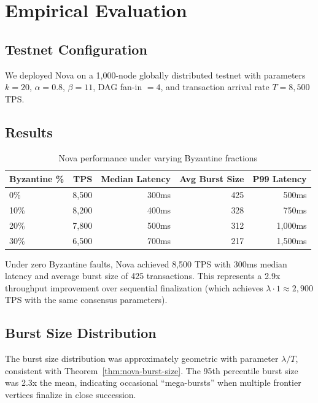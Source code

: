 \section{Empirical Evaluation}

\label{sec:nova-evaluation}

\subsection{Testnet Configuration}

We deployed Nova on a 1,000-node globally distributed testnet with parameters
$k = 20$, $\alpha = 0.8$, $\beta = 11$, DAG fan-in $= 4$, and transaction arrival
rate $T = 8{,}500$ TPS.

\subsection{Results}

\begin{table}[h]
\centering
\begin{tabular}{@{}lrrrr@{}}
\toprule
\textbf{Byzantine \%} & \textbf{TPS} & \textbf{Median Latency} & \textbf{Avg Burst Size} & \textbf{P99 Latency} \\
\midrule
0\% & 8,500 & 300ms & 425 & 500ms \\
10\% & 8,200 & 400ms & 328 & 750ms \\
20\% & 7,800 & 500ms & 312 & 1,000ms \\
30\% & 6,500 & 700ms & 217 & 1,500ms \\
\bottomrule
\end{tabular}
\caption{Nova performance under varying Byzantine fractions}
\label{tab:nova-nova-results}
\end{table}

Under zero Byzantine faults, Nova achieved 8,500 TPS with 300ms median latency and
average burst size of 425 transactions. This represents a 2.9x throughput improvement
over sequential finalization (which achieves $\lambda \cdot 1 \approx 2,900$ TPS with
the same consensus parameters).

\subsection{Burst Size Distribution}

The burst size distribution was approximately geometric with parameter $\lambda/T$,
consistent with Theorem~\ref{thm:nova-burst-size}. The 95th percentile burst size was
2.3x the mean, indicating occasional ``mega-bursts'' when multiple frontier vertices
finalize in close succession.

